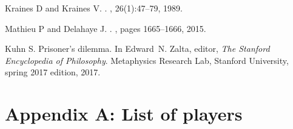 \documentclass[10pt,letterpaper]{article}
\begin{document}
\begin{thebibliography}{10}
Kraines D and Kraines V.
.
, 26(1):47--79, 1989.

Mathieu P and Delahaye J.
.
, pages 1665--1666, 2015.

Kuhn S.
\newblock Prisoner's dilemma.
\newblock In Edward~N. Zalta, editor, {\em The Stanford Encyclopedia of
  Philosophy}. Metaphysics Research Lab, Stanford University, spring 2017
  edition, 2017.

\end{thebibliography}

\appendix

\section{Appendix A: List of players}\label{app:list_of_players}
\end{document}
